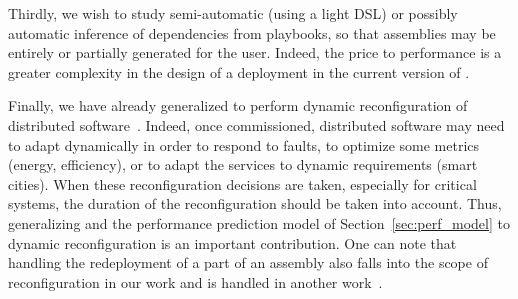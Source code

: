 Thirdly, we wish to study semi-automatic (\eg using a light DSL) or possibly automatic inference of dependencies from \ansible playbooks, so that \mad assemblies may be entirely or partially generated for the user. Indeed, the price to performance is a greater complexity in the design of a deployment in the current version of \mad.

Finally, we have already generalized \mad to perform dynamic reconfiguration of distributed software~\cite{ccgridmaverick}. Indeed, once commissioned, distributed software may need to adapt dynamically in order to respond to faults, to optimize some metrics (\eg energy, efficiency), or to adapt the services to dynamic requirements (\eg smart cities). When these reconfiguration decisions are taken, especially for critical systems, the duration of the reconfiguration should be taken into account. Thus, generalizing \mad and the performance prediction model of Section~\ref{sec:perf_model} to dynamic reconfiguration is an important contribution. One can note that handling the redeployment of a part of an assembly also falls into the scope of reconfiguration in our work and is handled in another work~\cite{ccgridmaverick}.

  
